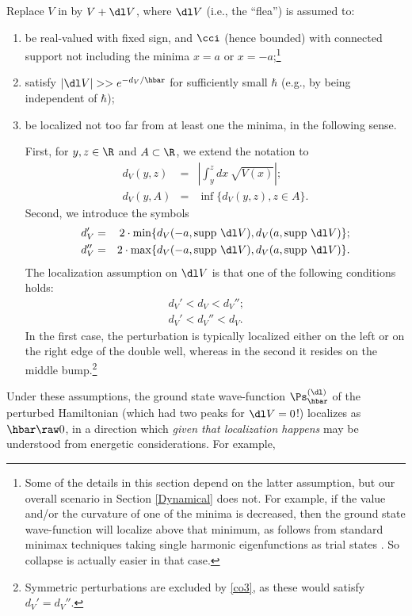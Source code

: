 \documentclass[12pt]{article}
\begin{document}
Replace $V$ in  by $V+\dl V$, where $\dl V$ (i.e., the ``flea'')  is assumed to:
\begin{enumerate}
\item be real-valued with fixed sign, and $\cci$ (hence bounded) with connected support  not including the minima $x=a$ or $x=-a$;\footnote{
Some of the details in this section depend on the latter assumption, but our overall scenario in Section \ref{Dynamical} does not. 
For example, if the value and/or the curvature of one of the minima is decreased, then the ground state wave-function will localize above that minimum, as follows from standard minimax techniques taking single harmonic eigenfunctions as trial states \cite{GGJL,RS4}. So collapse is actually easier in that case.}
\item satisfy $|\dl V| >> e^{-d_V/\hbar}$ for sufficiently small $\hbar$ (e.g., by being  independent of $\hbar$);
\item\label{co3}  be localized not too far from at least one the minima, in the following sense. 

First, for $y,z\in\R$  and $A\subset\R$, we extend the notation  to 
\begin{eqnarray}
d_V(y,z)&=&\left| \int_y^z dx\, \sqrt{V(x)}\right|;\label{Cwkb2}\\
d_V(y,A)&=& \inf\{ d_V(y,z), z\in A\}.
\end{eqnarray}
Second, we introduce the symbols
\begin{eqnarray}
d_V'&=&2\cdot \min\{d_V(-a,\mbox{supp}\ \dl V),d_V(a,\mbox{supp}\ \dl V)\};\\
d_V''&=&2\cdot \max\{d_V(-a,\mbox{supp}\ \dl V),d_V(a,\mbox{supp}\ \dl V)\}.
\end{eqnarray}
The localization assumption on $\dl V$ is that one of the following conditions holds:
\begin{eqnarray}
d_V'< d_V< d_V'' ; && \label{case1a} \\
d_V'< d_V''< d_V \label{case2a}.
\end{eqnarray}
In the first case, the perturbation is typically localized either on the left or on the right edge of the double well, whereas in the second it resides
 on the middle bump.\footnote{Symmetric perturbations are excluded by \ref{co3}, as these would satisfy  $d_V'=d_V''$.}
\end{enumerate}
Under these assumptions,  the ground state wave-function $\Ps^{(\dl)}_{\hbar}$ of the perturbed Hamiltonian (which had two peaks for $\dl V=0$!) localizes as $\hbar\raw 0$, in a direction which \emph{given that localization happens} may be understood from energetic considerations. For example,
\end{document}
